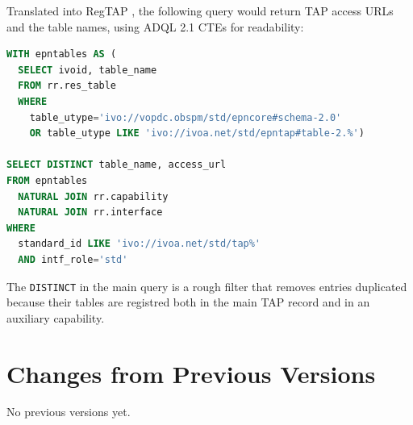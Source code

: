 \documentclass[11pt,a4paper]{ivoa}
\begin{document}
Translated into RegTAP \citep{2019ivoa.spec.1011D}, the following query
would return TAP access URLs and the table names, using ADQL 2.1 CTEs
for readability:

\begin{lstlisting}[language=SQL]
WITH epntables AS (
  SELECT ivoid, table_name
  FROM rr.res_table
  WHERE
    table_utype='ivo://vopdc.obspm/std/epncore#schema-2.0'
    OR table_utype LIKE 'ivo://ivoa.net/std/epntap#table-2.%')

SELECT DISTINCT table_name, access_url
FROM epntables
  NATURAL JOIN rr.capability
  NATURAL JOIN rr.interface
WHERE
  standard_id LIKE 'ivo://ivoa.net/std/tap%'
  AND intf_role='std'
\end{lstlisting}

The \texttt{DISTINCT} in the main query is a rough filter that removes
entries duplicated because their tables are registred both in the main
TAP record and in an auxiliary capability.

\appendix
\section{Changes from Previous Versions}

No previous versions yet.  



\end{document}
